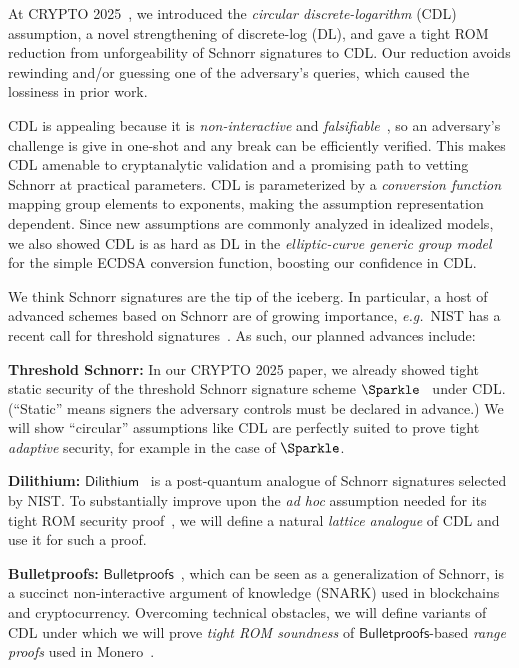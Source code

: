 
At CRYPTO 2025~\cite{C:CFOS25}, we introduced the \emph{circular discrete-logarithm} (CDL) assumption, a novel  strengthening of discrete-log (DL), and gave a tight ROM reduction from unforgeability of Schnorr signatures to CDL. Our reduction avoids rewinding and/or guessing one of the adversary's queries, which caused the lossiness in prior work.

CDL is appealing because it is \emph{non-interactive} and \emph{falsifiable}~\cite{C:Naor03}, 
so an adversary’s challenge is give in one-shot and any break can be efficiently verified. 
This makes CDL amenable to cryptanalytic validation and a promising path to vetting Schnorr 
at practical parameters. CDL is parameterized by a \emph{conversion function} mapping group elements to 
exponents, making the assumption representation dependent. Since new
assumptions are commonly analyzed in idealized models, we also showed CDL is as hard as DL 
in the \emph{elliptic-curve generic group model}~\cite{EC:GroSho22} for the simple ECDSA conversion 
function,  boosting our confidence in CDL.

We think Schnorr signatures are  the tip of the iceberg. In particular, a host of advanced schemes based on Schnorr are of growing importance, \emph{e.g.}~NIST has a recent call for threshold  signatures~\cite{nistmpc}. As such,  our planned advances include: 
	\begin{newitemize}	
    \item \textbf{Threshold Schnorr:} In our CRYPTO 2025 paper, we already showed tight static security of the  threshold Schnorr signature scheme $\Sparkle$~\cite{C:CriKomMal23} under CDL.  (``Static''  means signers  the adversary controls must be declared in advance.)  We will show  ``circular'' assumptions like CDL are perfectly suited to prove tight \emph{adaptive} security, for example in the case of $\Sparkle$. %
	\item \textbf{Dilithium:} $\mathsf{Dilithium}$~\cite{Dilithium} is a post-quantum analogue of Schnorr signatures selected by NIST. To substantially improve upon the \emph{ad hoc} assumption  needed for its tight ROM security proof~\cite{Dilithium}, we will define a natural \emph{lattice analogue} of CDL and use it for such a proof.
    
    	\item \textbf{Bulletproofs:} $\mathsf{Bulletproofs}$~\cite{Bulletproofs}, which can be seen as a generalization of Schnorr, is a succinct non-interactive argument of knowledge (SNARK) used in blockchains and cryptocurrency. Overcoming technical obstacles, we will define variants of CDL under which we will prove \emph{tight ROM soundness} of $\mathsf{Bulletproofs}$-based \emph{range proofs} used in Monero~\cite{monero1,monero2}.
\end{newitemize}

